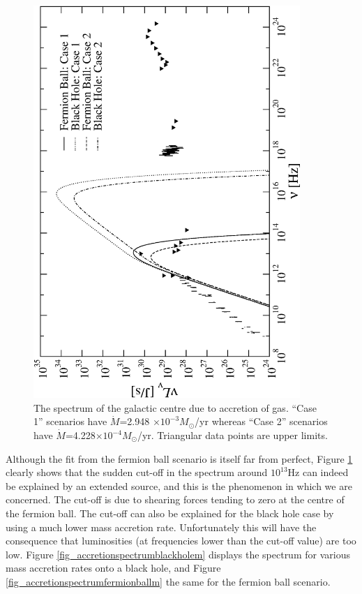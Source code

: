 \begin{figure}[ht]
	\begin{center}
	\includegraphics[angle=-90,width=0.9\textwidth]{eps/spectrum-melialimits.eps}
	\caption{The spectrum of the galactic centre due to accretion of gas. ``Case 1'' scenarios have $\dot{M}$=2.948
	$\times 10^{-3}M_\odot$/yr whereas ``Case 2'' scenarios have $\dot{M}$=4.228$\times 10^{-4}M_\odot$/yr.
	Triangular data points are upper limits.}
	\label{fig_accretionspectrummelia}
	\end{center}
\end{figure}

Although the fit from the fermion ball scenario is itself far from perfect, Figure \ref{fig_accretionspectrummelia} clearly shows
that the sudden cut-off in the spectrum around $10^{13}$Hz can indeed be explained by an extended source, and this is the
phenomenon in which we are concerned. The cut-off is due to shearing forces tending to zero at the centre of the fermion ball.
The cut-off can also be explained for the black hole case by using a much lower mass accretion rate.
Unfortunately this will have the consequence that luminosities (at frequencies lower than the cut-off value) are too low. Figure
\ref{fig_accretionspectrumblackholem} displays the spectrum for various mass accretion rates onto a black hole, and Figure
\ref{fig_accretionspectrumfermionballm} the same for the fermion ball scenario.

